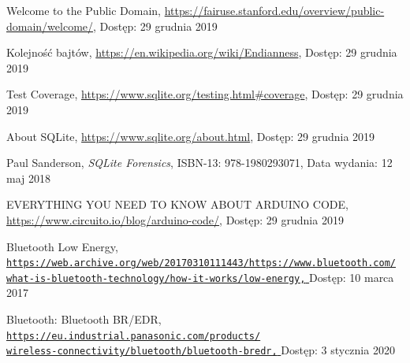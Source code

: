 \documentclass[a4paper,12pt, twoside]{article}
\begin{document}
\begin{thebibliography}{}
    		Welcome to the Public Domain,
    		\newline\url{https://fairuse.stanford.edu/overview/public-domain/welcome/}, 
    		\newline Dostęp: 29 grudnia 2019
    		
    		Kolejność bajtów,
    		\newline\url{https://en.wikipedia.org/wiki/Endianness}, 
    		\newline Dostęp: 29 grudnia 2019
    		
    		Test Coverage,
    		\newline\url{https://www.sqlite.org/testing.html#coverage}, 
    		\newline Dostęp: 29 grudnia 2019
    		
    		About SQLite,
    		\newline\url{https://www.sqlite.org/about.html}, 
    		\newline Dostęp: 29 grudnia 2019
    		
    	    Paul Sanderson, \textit{SQLite Forensics}, ISBN-13: 978-1980293071,
    		\newline Data wydania: 12 maj 2018
    		
    		EVERYTHING YOU NEED TO KNOW ABOUT ARDUINO CODE,
    		\newline\url{https://www.circuito.io/blog/arduino-code/}, 
    		\newline Dostęp: 29 grudnia 2019
    		
    		Bluetooth Low Energy,
    		\newline\href{https://web.archive.org/web/20170310111443/https://www.bluetooth.com/what-is-bluetooth-technology/how-it-works/low-energy}
    		 {\nolinkurl{https://web.archive.org/web/20170310111443/https://www.bluetooth.com/}
                 \\
                  \nolinkurl{what-is-bluetooth-technology/how-it-works/low-energy,}
                 }
    		\newline Dostęp: 10 marca 2017
    		
    		Bluetooth: Bluetooth BR/EDR,
    		\newline\href{https://eu.industrial.panasonic.com/products/wireless-connectivity/bluetooth/bluetooth-bredr}
    		 {\nolinkurl{https://eu.industrial.panasonic.com/products/}
                 \\
                  \nolinkurl{wireless-connectivity/bluetooth/bluetooth-bredr,}
                 }
    		\newline Dostęp: 3 stycznia 2020
    

\end{thebibliography}
\end{document}
